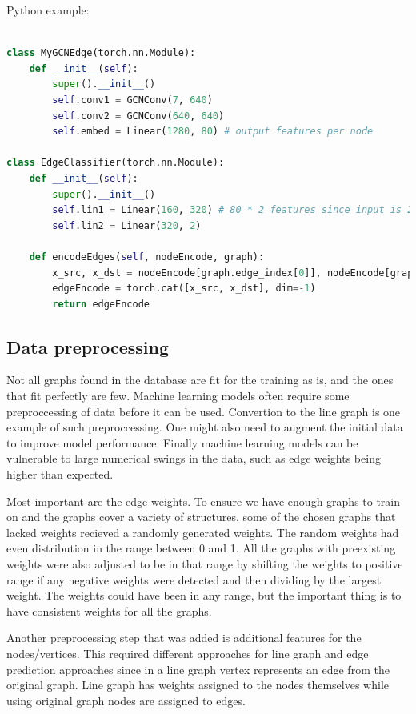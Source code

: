 Python example:

\begin{lstlisting}[language=Python]

class MyGCNEdge(torch.nn.Module):
    def __init__(self):
        super().__init__()
        self.conv1 = GCNConv(7, 640)
        self.conv2 = GCNConv(640, 640)
        self.embed = Linear(1280, 80) # output features per node

class EdgeClassifier(torch.nn.Module):
    def __init__(self):
        super().__init__()
        self.lin1 = Linear(160, 320) # 80 * 2 features since input is 2 nodes.
        self.lin2 = Linear(320, 2)

    def encodeEdges(self, nodeEncode, graph):
        x_src, x_dst = nodeEncode[graph.edge_index[0]], nodeEncode[graph.edge_index[1]]
        edgeEncode = torch.cat([x_src, x_dst], dim=-1)        
        return edgeEncode

\end{lstlisting}

\subsection{Data preprocessing}
\label{sec:preprocessing}
Not all graphs found in the database are fit for the training as is, and the ones that fit perfectly are few. Machine learning models often require some preproccessing of data before it can be used. Convertion to the line graph is one example of such preproccessing. One might also need to augment the initial data to improve model performance. Finally machine learning models can be vulnerable to large numerical swings in the data, such as edge weights being higher than expected.

Most important are the edge weights. To ensure we have enough graphs to train on and the graphs cover a variety of structures, some of the chosen graphs that lacked weights recieved a randomly generated weights. The random weights had even distribution in the range between 0 and 1. All the graphs with preexisting weights were also adjusted to be in that range by shifting the weights to positive range if any negative weights were detected and then dividing by the largest weight. The weights could have been in any range, but the important thing is to have consistent weights for all the graphs. 

Another preprocessing step that was added is additional features for the nodes/vertices. This required different approaches for line graph and edge prediction approaches since in a line graph vertex represents an edge from the original graph. Line graph has weights assigned to the nodes themselves while using original graph nodes are assigned to edges.

